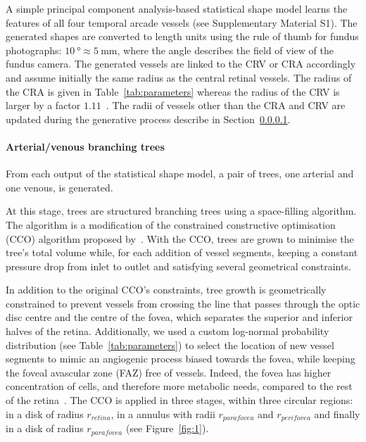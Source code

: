 \documentclass[11pt,]{article}
\begin{document}
A simple principal component analysis-based statistical shape model learns the features of all four temporal arcade vessels (see Supplementary Material S1).
The generated shapes are converted to length units using the rule of thumb for fundus photographs: $\SI{10}{\degree}\approx\SI{5}{\mm}$, where the angle describes the
field of view of the fundus camera. The generated vessels are linked
to the CRV or CRA accordingly and
assume initially the same radius as the central retinal vessels.
The radius of the CRA is given in Table~\ref{tab:parameters} whereas the radius of the CRV is larger by a factor $1.11$~\cite{Goldenberg2013}.
The radii of vessels other than the CRA and CRV are updated during the generative process describe in Section~\ref{sec:CCO}.

\paragraph{Arterial/venous branching trees}\label{sec:CCO}

From each output of the statistical shape model, a pair of trees, one
arterial and one venous, is generated.

At this stage, trees are structured branching trees using a
space-filling algorithm. The algorithm is a modification of the
constrained constructive optimisation (CCO) algorithm proposed
by~\cite{Talou2021}. With the CCO, trees are grown to minimise the tree’s
total volume while, for each addition of vessel segments,
keeping a constant pressure drop from
inlet to outlet and satisfying several geometrical constraints.

In addition to the original CCO’s constraints, tree growth is
geometrically constrained to prevent vessels from crossing the line
that passes through the optic disc centre and the centre of the fovea,
which separates the superior and inferior halves of the
retina. Additionally, we used a custom log-normal probability distribution (see Table~\ref{tab:parameters})
to select the location of new vessel segments to mimic an angiogenic
process biased towards the fovea, while keeping the foveal avascular
zone (FAZ) free of vessels. 
Indeed, the fovea has higher concentration
of cells, and therefore more metabolic needs, compared to the rest of
the retina~\cite{Zouache2022}.
The CCO is applied in three stages, within three circular regions: in
a disk of radius $r_{retina}$, in a annulus with radii $r_{parafovea}$ and $r_{perifovea}$
and finally in a disk of radius $r_{parafovea}$
(see Figure~\ref{fig:1}).
\end{document}
